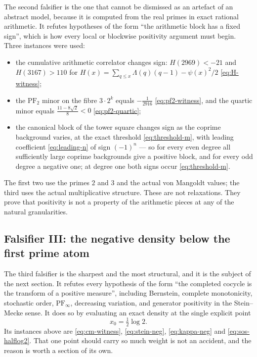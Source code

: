 \documentclass[11pt]{amsart}
\theoremstyle{definition}
\theoremstyle{remark}
\theoremstyle{definition}
\begin{document}
The second falsifier is the one that cannot be dismissed as an artefact of an abstract model,
because it is computed from the real primes in exact rational arithmetic. It refutes hypotheses of
the form ``the arithmetic block has a fixed sign'', which is how every local or blockwise
positivity argument must begin. Three instances were used:
\begin{itemize}[leftmargin=*]
\item the cumulative arithmetic correlator changes sign:
      $H(2969)<-21$ and $H(3167)>110$ for
      $H(x)=\sum_{q\le x}\Lambda(q)(q-1)-\psi(x)^2/2$ \eqref{eq:H-witness};
\item the $\mathrm{PF}_2$ minor on the fibre $3\cdot2^k$ equals $-\tfrac{1}{2916}$
      \eqref{eq:pf2-witness}, and the quartic minor equals $\tfrac{11-8\sqrt2}{8}<0$
      \eqref{eq:pf2-quartic};
\item the canonical block of the tower square changes sign as the coprime background varies,
      at the exact threshold \eqref{eq:threshold-m}, with leading coefficient
      \eqref{eq:leading-n} of sign $(-1)^n$ --- so for every even degree all sufficiently large
      coprime backgrounds give a positive block, and for every odd degree a negative one; at
      degree one both signs occur \eqref{eq:threshold-m}.
\end{itemize}
The first two use the primes $2$ and $3$ and the actual von Mangoldt values; the third uses the
actual multiplicative structure. These are not relaxations. They prove that positivity is not a
property of the arithmetic pieces at any of the natural granularities.

\subsection{Falsifier III: the negative density below the first prime atom}
\label{sec:fals-halflog2}

The third falsifier is the sharpest and the most structural, and it is the subject of the next
section. It refutes every hypothesis of the form ``the completed cocycle is the transform of a
positive measure'', including Bernstein, complete monotonicity, stochastic order,
$\mathrm{PF}_\infty$, decreasing variation, and generator positivity in the Stein--Mecke sense. It
does so by evaluating an exact density at the single explicit point
\begin{equation}\label{eq:x0}
   x_0=\tfrac12\log2 .
\end{equation}
Its instances above are \eqref{eq:cm-witness}, \eqref{eq:stein-neg}, \eqref{eq:kappa-neg} and
\eqref{eq:sos-halflog2}. That one point should carry so much weight is not an accident, and the
reason is worth a section of its own.
\end{document}

